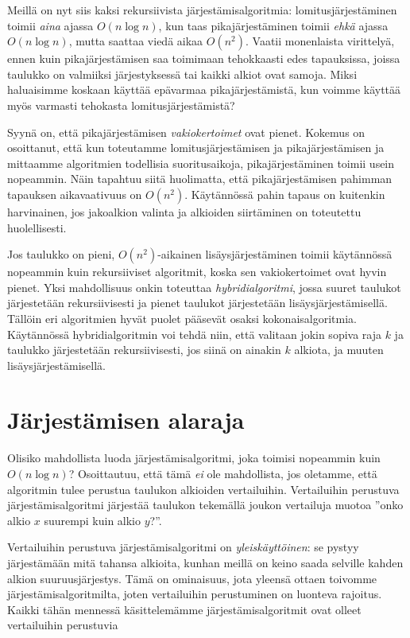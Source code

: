 Meillä on nyt siis kaksi rekursiivista järjestämisalgoritmia:
lomitusjärjestä\-minen toimii \emph{aina} ajassa $O(n \log n)$,
kun taas pikajärjestäminen toimii \emph{ehkä} ajassa $O(n \log n)$,
mutta saattaa viedä aikaa $O(n^2)$.
Vaatii monenlaista virittelyä,
ennen kuin pikajärjestämisen saa toimimaan tehokkaasti
edes tapauksissa, joissa taulukko on valmiiksi järjestyksessä
tai kaikki alkiot ovat samoja.
Miksi haluaisimme koskaan käyttää epävarmaa pikajärjestämistä,
kun voimme käyttää myös varmasti tehokasta lomitusjärjestämistä?


Syynä on, että pikajärjestämisen \emph{vakiokertoimet} ovat pienet.
Kokemus on osoittanut, että kun toteutamme lomitusjärjestämisen ja
pikajärjestämisen ja mittaamme algoritmien todellisia suoritusaikoja,
pikajärjestäminen toimii usein nopeammin.
Näin tapahtuu siitä huolimatta, että pikajärjestämisen pahimman
tapauksen aikavaativuus on $O(n^2)$.
Käytännössä pahin tapaus on kuitenkin harvinainen,
jos jakoalkion valinta ja alkioiden siirtäminen on toteutettu huolellisesti.


Jos taulukko on pieni, $O(n^2)$-aikainen lisäysjärjestäminen
toimii käytän\-nössä nopeammin kuin rekursiiviset algoritmit,
koska sen vakiokertoimet ovat hyvin pienet.
Yksi mahdollisuus onkin toteuttaa \emph{hybridialgoritmi},
jossa suuret taulukot järjes\-tetään rekursiivisesti
ja pienet taulukot järjes\-tetään lisäysjärjestämisellä.
Tällöin eri algoritmien hyvät puolet pääsevät osaksi
kokonaisalgoritmia.
Käytännössä hybridialgoritmin voi tehdä niin,
että valitaan jokin sopiva raja $k$ ja
taulukko järjestetään rekursiivisesti,
jos siinä on ainakin $k$ alkiota, ja muuten lisäysjärjestämisellä.

\section{Järjestämisen alaraja}

Olisiko mahdollista luoda järjestämisalgoritmi, joka toimisi
nopeammin kuin $O(n \log n)$?
Osoittautuu, että tämä \emph{ei} ole mahdollista,
jos oletamme, että algoritmin tulee perustua taulukon
alkioiden vertailuihin.
Vertailuihin perustuva järjestämisalgoritmi järjestää taulukon
tekemällä joukon vertailuja muotoa
''onko alkio $x$ suurempi kuin alkio $y$?''.

Vertailuihin perustuva järjestämisalgoritmi on \emph{yleiskäyttöinen}:
se pystyy järjestämään mitä tahansa alkioita,
kunhan meillä on keino saada selville kahden alkion suuruusjärjestys.
Tämä on ominaisuus, jota yleensä ottaen toivomme
järjestämisalgoritmilta, joten vertailuihin perustuminen
on luonteva rajoitus.
Kaikki tähän mennessä käsittelemämme järjestämisalgoritmit
ovat olleet vertailuihin perustuvia

